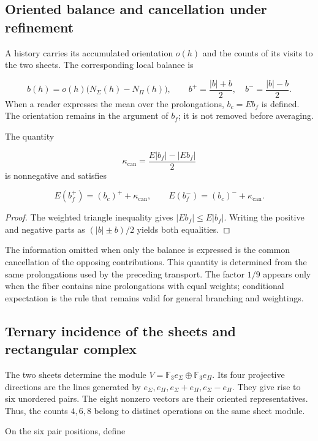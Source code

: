 \subsection{Oriented balance and cancellation under refinement}
A history carries its accumulated orientation \(o(h)\) and the counts of its visits to the two sheets. The corresponding local balance is

\[
b(h)=o(h)\bigl(N_\Sigma(h)-N_\Pi(h)\bigr),
\qquad
b^+=\frac{|b|+b}{2},\quad b^-=\frac{|b|-b}{2}.
\]
When a reader expresses the mean over the prolongations, \(b_c=Eb_f\) is defined. The orientation remains in the argument of \(b_f\); it is not removed before averaging.

\begin{proposition}
\label{act21:prop:continuo-defecto-cancelacion}
The quantity

\[
\kappa_{\mathrm{can}}=
\frac{E|b_f|-|Eb_f|}{2}
\]
is nonnegative and satisfies

\[
E(b_f^+)=(b_c)^++\kappa_{\mathrm{can}},
\qquad
E(b_f^-)=(b_c)^-+\kappa_{\mathrm{can}}.
\]
\end{proposition}
\begin{proof}
The weighted triangle inequality gives \(|Eb_f|\leq E|b_f|\). Writing the positive and negative parts as \((|b|\pm b)/2\) yields both equalities.
\end{proof}

The information omitted when only the balance is expressed is the common cancellation of the opposing contributions. This quantity is determined from the same prolongations used by the preceding transport. The factor \(1/9\) appears only when the fiber contains nine prolongations with equal weights; conditional expectation is the rule that remains valid for general branching and weightings.

\subsection{Ternary incidence of the sheets and rectangular complex}
The two sheets determine the module \(V=\mathbb F_3e_\Sigma\oplus\mathbb F_3e_\Pi\). Its four projective directions are the lines generated by \(e_\Sigma,e_\Pi,e_\Sigma+e_\Pi,e_\Sigma-e_\Pi\). They give rise to six unordered pairs. The eight nonzero vectors are their oriented representatives. Thus, the counts \(4,6,8\) belong to distinct operations on the same sheet module.

On the six pair positions, define

